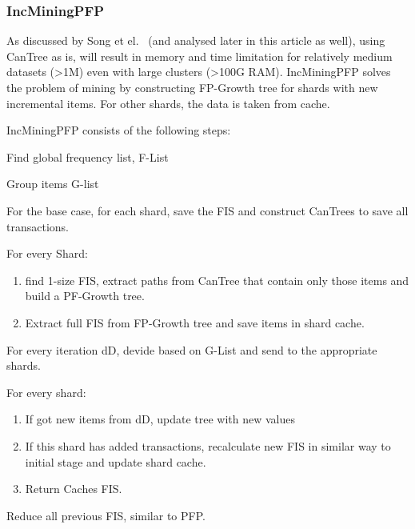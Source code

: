 \subsubsection{IncMiningPFP}
As discussed by Song et el.~\cite{song2017} (and analysed later in this article as well), using CanTree as is, will result in memory and time limitation for relatively medium datasets (>1M) even with large clusters (>100G RAM).  IncMiningPFP solves the problem of mining by constructing FP-Growth tree for shards with new incremental items. For other shards, the data is taken from cache.

IncMiningPFP consists of the following steps:
\begin{steps}
	\item Find global frequency list, F-List
	\item Group items G-list
	\item For the base case, for each shard, save the FIS and construct CanTrees to save all transactions.
	\item For every Shard:
			\begin{enumerate}
			\item find 1-size FIS, extract paths from CanTree that contain only those items and build a PF-Growth tree.
			\item Extract full FIS from FP-Growth tree and save items in shard cache.
			\end{enumerate}
	\item For every iteration dD, devide based on G-List and send to the appropriate shards.
	\item For every shard: 
				\begin{enumerate}
				\item If got new items from dD, update tree with new values
				\item If this shard has added transactions, recalculate new FIS in similar way to initial stage and update shard cache. 
				\item Return Caches FIS.
				\end{enumerate}
	\item Reduce all previous FIS, similar to PFP.
\end{steps}
